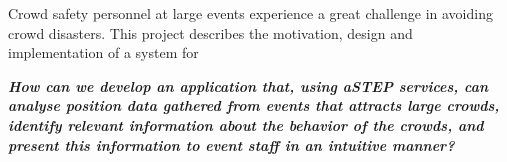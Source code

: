 \begin{center}
Crowd safety personnel at large events experience a great challenge in avoiding crowd disasters. This project describes the motivation, design and implementation of a system for 

\textbf{\textit{How can we develop an application that, using aSTEP services, can analyse position data gathered from events that attracts large crowds, identify relevant information about the behavior of the crowds, and present this information to event staff in an intuitive manner?}}





\end{center}
